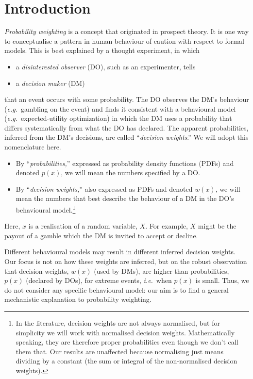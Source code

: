 \documentclass[a4paper, 12pt]{article}
\newcommand{\bi}{\begin{itemize}}
\newcommand{\ei}{\end{itemize}}
\newcommand{\ie}{{\it i.e.}\ }
\newcommand{\eg}{{\it e.g.}\ }
\begin{document}
\section{Introduction}
{\it Probability weighting} is a concept that originated in prospect theory. It is one way to conceptualise a pattern in human behaviour of caution with respect to formal models.
This is best explained by a thought experiment, in which  
\bi
	\item a \textit{disinterested observer} (DO), such as an experimenter, tells
	\item a \textit{decision maker} (DM)
\ei
that an event occurs with some probability. The DO observes the DM's behaviour (\eg gambling on the event) and finds it consistent with a behavioural model (\eg expected-utility optimization) in which the DM uses a probability that differs systematically from what the DO has declared. The apparent probabilities, inferred from the DM's decisions, are called ``{\it decision weights}.'' We will adopt this nomenclature here.
% 
\bi
	\item By ``\textit{probabilities,}'' expressed as probability density functions (PDFs) and denoted $p(x)$, we will mean the numbers specified by a DO.
	\item By ``\textit{decision weights,}'' also expressed as PDFs and denoted $w(x)$, we will mean the numbers that best describe the behaviour of a DM in the DO's behavioural model.\footnote{In the literature, decision weights are not always normalised, but for simplicity we will work with normalised decision weights. Mathematically speaking, they are therefore proper probabilities even though we don't call them that. Our results are unaffected because normalising just means dividing by a constant (the sum or integral of the non-normalised decision weights).}
\ei
Here, $x$ is a realisation of a random variable, $X$. For example, $X$ might be the payout of a gamble which the DM is invited to accept or decline.

Different behavioural models may result in different inferred decision weights. Our focus is not on how these weights are inferred, but on the robust observation that decision weights, $w(x)$ (used by DMs), are higher than probabilities, $p(x)$ (declared by DOs), for extreme events, \ie when $p(x)$ is small. Thus, we do not consider any specific behavioural model: our aim is to find a general mechanistic explanation to probability weighting.
\end{document}
